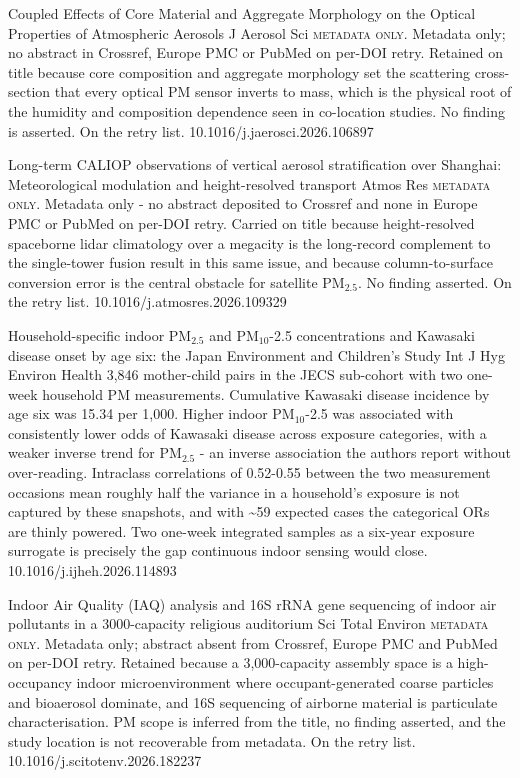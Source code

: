 \documentclass[10pt]{article}
\begin{document}
{Coupled Effects of Core Material and Aggregate Morphology on the Optical Properties of Atmospheric Aerosols}
{J Aerosol Sci}
{\textsc{metadata only.} Metadata only; no abstract in Crossref, Europe PMC or PubMed on per-DOI retry. Retained on title because core composition and aggregate morphology set the scattering cross-section that every optical PM sensor inverts to mass, which is the physical root of the humidity and composition dependence seen in co-location studies. No finding is asserted. On the retry list.}
{10.1016/j.jaerosci.2026.106897}

{Long-term CALIOP observations of vertical aerosol stratification over Shanghai: Meteorological modulation and height-resolved transport}
{Atmos Res}
{\textsc{metadata only.} Metadata only - no abstract deposited to Crossref and none in Europe PMC or PubMed on per-DOI retry. Carried on title because height-resolved spaceborne lidar climatology over a megacity is the long-record complement to the single-tower fusion result in this same issue, and because column-to-surface conversion error is the central obstacle for satellite PM$_{2.5}$. No finding asserted. On the retry list.}
{10.1016/j.atmosres.2026.109329}


{Household-specific indoor PM$_{2.5}$ and PM$_{10}$-2.5 concentrations and Kawasaki disease onset by age six: the Japan Environment and Children's Study}
{Int J Hyg Environ Health}
{3,846 mother-child pairs in the JECS sub-cohort with two one-week household PM measurements. Cumulative Kawasaki disease incidence by age six was 15.34 per 1,000. Higher indoor PM$_{10}$-2.5 was associated with consistently lower odds of Kawasaki disease across exposure categories, with a weaker inverse trend for PM$_{2.5}$ - an inverse association the authors report without over-reading. Intraclass correlations of 0.52-0.55 between the two measurement occasions mean roughly half the variance in a household's exposure is not captured by these snapshots, and with \textasciitilde{}59 expected cases the categorical ORs are thinly powered. Two one-week integrated samples as a six-year exposure surrogate is precisely the gap continuous indoor sensing would close.}
{10.1016/j.ijheh.2026.114893}

{Indoor Air Quality (IAQ) analysis and 16S rRNA gene sequencing of indoor air pollutants in a 3000-capacity religious auditorium}
{Sci Total Environ}
{\textsc{metadata only.} Metadata only; abstract absent from Crossref, Europe PMC and PubMed on per-DOI retry. Retained because a 3,000-capacity assembly space is a high-occupancy indoor microenvironment where occupant-generated coarse particles and bioaerosol dominate, and 16S sequencing of airborne material is particulate characterisation. PM scope is inferred from the title, no finding asserted, and the study location is not recoverable from metadata. On the retry list.}
{10.1016/j.scitotenv.2026.182237}
\end{document}
